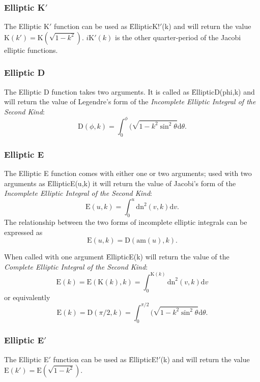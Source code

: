 \subsubsection{Elliptic K$'$}

The Elliptic K$'$ function can be used as \f{EllipticK!$'$(k)} and will 
return the value $\mathrm{K}(k')=\mathrm{K}(\sqrt{1-k^2})$. $i\mathrm{K}'(k)$ is
the other quarter-period of the Jacobi elliptic functions.

\subsubsection{Elliptic D}

The Elliptic D function takes two arguments.
It is called as \f{EllipticD(phi,k)}
and will return the value of Legendre's form of
the \emph{Incomplete Elliptic Integral of the Second Kind}:
\[\mathrm{D}(\phi, k)=\int_0^\phi (\sqrt{1-k^2 \sin^2 \theta} \mathrm{d}\theta.\]

\subsubsection{Elliptic E}

The Elliptic E function comes with either one or two arguments;
used with two arguments as \f{EllipticE(u,k)}
it will return the value of Jacobi's form of
the \emph{Incomplete Elliptic Integral of the Second Kind}:
\[\mathrm{E}(u, k)=\int_0^u \mathrm{dn}^2 (v, k) \mathrm{d}v.\]
The relationship between the two forms of incomplete elliptic integrals can
be expressed as
\[\mathrm{E}(u, k) = \mathrm{D}(\mathrm{am}(u), k).\]

When called with one argument \f{EllipticE(k)} will return the value of the
\emph{Complete Elliptic Integral of the Second Kind}:
\[\mathrm{E}(k)=\mathrm{E}(\mathrm{K}(k), k)
=\int_0^{\mathrm{K}(k)} \mathrm{dn}^2(v, k)  \mathrm{d}v\]
or equivalently
\[\mathrm{E}(k)=\mathrm{D}(\pi/2, k) =
\int_0^{\pi/2} (\sqrt{1-k^2 \sin^2 \theta} \mathrm{d}\theta.\]
\subsubsection{Elliptic E$'$}

The Elliptic E$'$ function can be used as \f{EllipticE!$'$(k)} and will 
return the value $\mathrm{E}(k') = \mathrm{E}(\sqrt{1-k^2})$.

%
%

